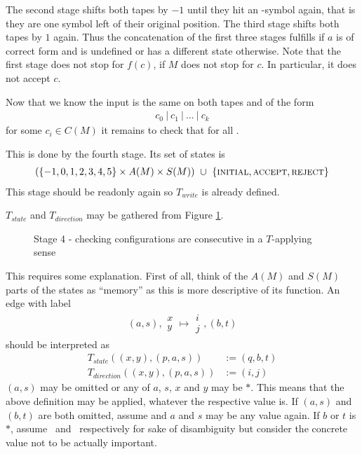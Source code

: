 	The second stage shifts both tapes by $-1$ until they hit an \EMP-symbol again, that is they are one symbol left of their original position.
	The third stage shifts both tapes by $1$ again.
	Thus the concatenation of the first three stages fulfills  if $a$ is of correct form and is undefined or has a different state otherwise.
	Note that the first stage does not stop for $f(c)$, if $M$ does not stop for $c$. In particular, it does not accept $c$.

	Now that we know the input is the same on both tapes and of the form
	\begin{align*}
		c_0~|~c_1~|~...~|~c_k
	\end{align*}
	for some $c_i \in C(M)$ it remains to check that  for all .

	This is done by the fourth stage.
	Its set of states is
	\begin{align*}
		(\{-1,0,1,2,3,4,5\} \times A(M) \times S(M))~\cup~\{\text{\scshape{initial}},\text{\scshape{accept}},\text{\scshape{reject}}\}
	\end{align*}
	This stage should be readonly again so $T_{write}$ is already defined.

	$T_{state}$ and $T_{direction}$ may be gathered from Figure \ref{turing_machines:main_theorem:fig_stage4}.

	\begin{figure}
		\centering
		
		\caption{Stage 4 - checking configurations are consecutive in a $T$-applying sense}
		\label{turing_machines:main_theorem:fig_stage4}
	\end{figure}

	This requires some explanation. First of all, think of the $A(M)$ and $S(M)$ parts of the states as ``memory'' as this is more descriptive of its function.
	An edge  with label
	\begin{align*}
		(a,s),\begin{matrix} x \\ y \end{matrix} \mapsto \begin{matrix} i \\ j \end{matrix}, (b,t)
	\end{align*}
	should be interpreted as
	\begin{align*}
		T_{state}((x,y),(p,a,s)) &:= (q,b,t) \\
		T_{direction}((x,y),(p,a,s)) &:= (i,j)
	\end{align*}
	$(a,s)$ may be omitted or any of $a$, $s$, $x$ and $y$ may be $*$. This means that the above definition may be applied, whatever the respective value is.
	If $(a,s)$ and $(b,t)$ are both omitted, assume  and $a$ and $s$ may be any value again.
	If $b$ or $t$ is $*$, assume ~and ~respectively for sake of disambiguity but consider the concrete value not to be actually important.

